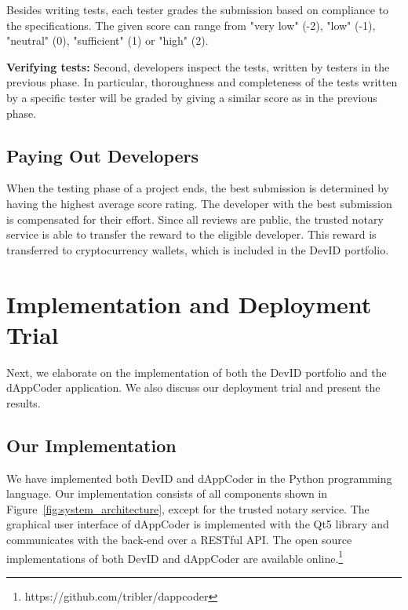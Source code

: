 Besides writing tests, each tester grades the submission based on compliance to the specifications.
The given score can range from "very low" (-2), "low" (-1), "neutral" (0), "sufficient" (1) or "high" (2).

\textbf{Verifying tests:}
Second, developers inspect the tests, written by testers in the previous phase.
In particular, thoroughness and completeness of the tests written by a specific tester will be graded by giving a similar score as in the previous phase.

\subsection{Paying Out Developers}
\label{subsec:dappcoder_payout}
When the testing phase of a project ends, the best submission is determined by having the highest average score rating.
The developer with the best submission is compensated for their effort.
Since all reviews are public, the trusted notary service is able to transfer the reward to the eligible developer.
This reward is transferred to cryptocurrency wallets, which is included in the DevID portfolio.

\section{Implementation and Deployment Trial}
\label{sec:experiments}
Next, we elaborate on the implementation of both the DevID portfolio and the dAppCoder application.
We also discuss our deployment trial and present the results.

\subsection{Our Implementation}
We have implemented both DevID and dAppCoder in the Python programming language.
Our implementation consists of all components shown in Figure~\ref{fig:system_architecture}, except for the trusted notary service.
The graphical user interface of dAppCoder is implemented with the Qt5 library and communicates with the back-end over a RESTful API.
The open source implementations of both DevID and dAppCoder are available online.\footnote{https://github.com/tribler/dappcoder}

